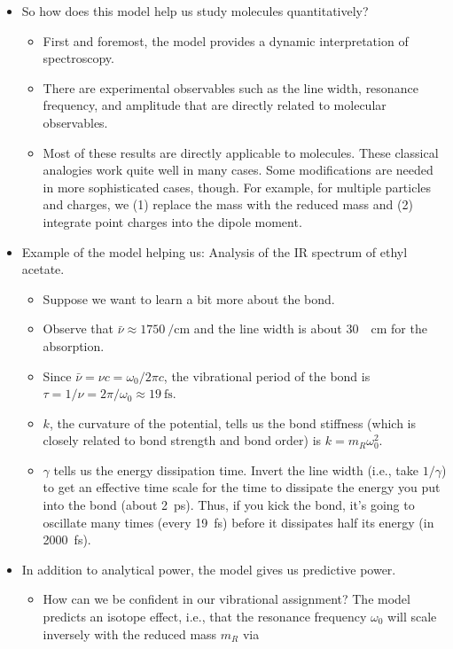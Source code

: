 \documentclass[../notes.tex]{subfiles}
\begin{document}
\begin{itemize}
\begin{itemize}
    \end{itemize}
    \item So how does this model help us study molecules quantitatively?
    \begin{itemize}
        \item First and foremost, the model provides a dynamic interpretation of spectroscopy.
        \item There are experimental observables such as the line width, resonance frequency, and amplitude that are directly related to molecular observables.
        \item Most of these results are directly applicable to molecules. These classical analogies work quite well in many cases. Some modifications are needed in more sophisticated cases, though. For example, for multiple particles and charges, we (1) replace the mass with the reduced mass and (2) integrate point charges into the dipole moment.
    \end{itemize}
    \item Example of the model helping us: Analysis of the IR spectrum of ethyl acetate.
    \begin{itemize}
        \item Suppose we want to learn a bit more about the  bond.
        \item Observe that $\bar{\nu}\approx\SI{1750}{\per\centi\meter}$ and the line width is about \SI{30}{\per\centi\meter} for the  absorption.
        \item Since $\bar{\nu}=\nu c=\omega_0/2\pi c$, the vibrational period of the  bond is $\tau=1/\nu=2\pi/\omega_0\approx\SI{19}{\femto\second}$.
        \item $k$, the curvature of the  potential, tells us the bond stiffness (which is closely related to bond strength and bond order) is $k=m_R\omega_0^2$.
        \item $\gamma$ tells us the energy dissipation time. Invert the line width (i.e., take $1/\gamma$) to get an effective time scale for the time to dissipate the energy you put into the bond (about \SI{2}{\pico\second}). Thus, if you kick the bond, it's going to oscillate many times (every \SI{19}{\femto\second}) before it dissipates half its energy (in \SI{2000}{\femto\second}).
    \end{itemize}
    \item In addition to analytical power, the model gives us predictive power.
    \begin{itemize}
        \item How can we be confident in our vibrational assignment? The model predicts an isotope effect, i.e., that the resonance frequency $\omega_0$ will scale inversely with the reduced mass $m_R$ via

\end{itemize}
\end{itemize}
\end{document}

